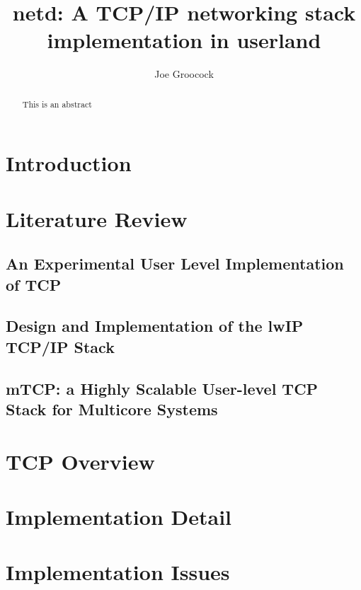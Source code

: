 \documentclass[10pt,a4paper,british]{bhamarticle}
\title{netd: A TCP/IP networking stack implementation in userland}
\author{Joe Groocock}
\begin{document}

\maketitle

\begin{abstract}
This is an abstract
\end{abstract}

\tableofcontents
\newpage


\section{Introduction}

\section{Literature Review}
\subsection{An Experimental User Level Implementation of TCP~\cite{braun:inria-00074040}}
\subsection{Design and Implementation of the lwIP TCP/IP Stack~\cite{lwip}}
\subsection{mTCP: a Highly Scalable User-level TCP Stack for Multicore Systems} %
\cite{jeong2014mtcp} %

\section{TCP Overview}

\section{Implementation Detail}

\section{Implementation Issues}
\end{document}
